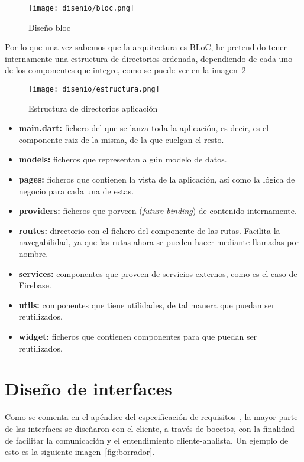 \begin{figure}[H]
	\centering
	\texttt{[image: disenio/bloc.png]}
	\caption{Diseño bloc}\label{fig:bloc}
\end{figure}

Por lo que una vez sabemos que la arquitectura es BLoC, he pretendido tener internamente una estructura de directorios ordenada, dependiendo de cada uno de los componentes que integre, como se puede ver en la imagen~\ref{fig:estructura}

\begin{figure}[H]
	\centering
	\texttt{[image: disenio/estructura.png]}
	\caption{Estructura de directorios aplicación}\label{fig:estructura}
\end{figure}

\begin{itemize}
	\item \textbf{main.dart:} fichero del que se lanza toda la aplicación, es decir, es el componente raiz de la misma, de la que cuelgan el resto.
	
	\item \textbf{models:} ficheros que representan algún modelo de datos. 
	
	\item \textbf{pages:} ficheros que contienen la vista de la aplicación, así como la lógica de negocio para cada una de estas. 
	
	\item \textbf{providers:} ficheros que porveen (\emph{future binding}) de contenido internamente.
	
	\item \textbf{routes:} directorio con el fichero del componente de las rutas. Facilita la navegabilidad, ya que las rutas ahora se pueden hacer mediante llamadas por nombre.
	
	\item \textbf{services:} componentes que proveen de servicios externos, como es el caso de Firebase.
	
	\item \textbf{utils:} componentes que tiene utilidades, de tal manera que puedan ser reutilizados.
	
	\item \textbf{widget:} ficheros que contienen componentes para que puedan ser reutilizados.
	
\end{itemize}

\section{Diseño de interfaces}\label{nterfaces }
Como se comenta en el apéndice del especificación de requisitos~\pageref{requisitos}, la mayor parte de las interfaces se diseñaron con el cliente, a través de bocetos, con la finalidad de facilitar la comunicación y el entendimiento cliente-analista. Un ejemplo de esto es la siguiente imagen~\ref{fig:borrador}.

